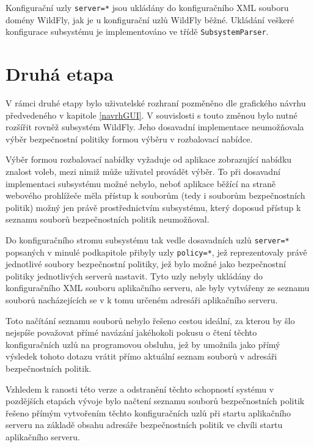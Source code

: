 Konfigurační uzly {\tt server=*} jsou ukládány do konfiguračního XML souboru domény WildFly, jak je u konfigurační uzlů WildFly běžné. Ukládání veškeré konfigurace subsystému je implementováno ve třídě {\tt SubsystemParser}.

\section{Druhá etapa}

V rámci druhé etapy bylo uživatelské rozhraní pozměněno dle grafického návrhu předvedeného v kapitole \ref{navrhGUI}. V souvislosti s touto změnou bylo nutné rozšířit rovněž subsystém WildFly. Jeho dosavadní implementace neumožňovala výběr bezpečnostní politiky formou výběru v rozbalovací nabídce.

Výběr formou rozbalovací nabídky vyžaduje od aplikace zobrazující nabídku znalost voleb, mezi nimiž může uživatel provádět výběr. To při dosavadní implementaci subsystému možné nebylo, neboť aplikace běžící na straně webového prohlížeče měla přístup k souborům (tedy i souborům bezpečnostních politik) možný jen právě prostřednictvím subsystému, který doposud přístup k seznamu souborů bezpečnostních politik neumožňoval.

Do konfiguračního stromu subsystému tak vedle dosavadních uzlů {\tt server=*} popsaných v minulé podkapitole přibyly uzly {\tt policy=*}, jež reprezentovaly právě jednotlivé soubory bezpečnostní politiky, jež bylo možné jako bezpečnostní politiky jednotlivých serverů nastavit. Tyto uzly nebyly ukládány do konfiguračního XML souboru aplikačního serveru, ale byly vytvářeny ze seznamu souborů nacházejících se v k tomu určeném adresáři aplikačního serveru.

Toto načítání seznamu souborů nebylo řešeno cestou ideální, za kterou by šlo nejspíše považovat přímé navázání jakéhokoli pokusu o čtení těchto konfiguračních uzlů na programovou obsluhu, jež by umožnila jako přímý výsledek tohoto dotazu vrátit přímo aktuální seznam souborů v adresáři bezpečnostních politik.

Vzhledem k ranosti této verze a odstranění těchto schopností systému v pozdějších etapách vývoje bylo načtení seznamu souborů bezpečnostních politik řešeno přímým vytvořením těchto konfiguračních uzlů při startu aplikačního serveru na základě obsahu adresáře bezpečnostních politik ve chvíli startu aplikačního serveru.

